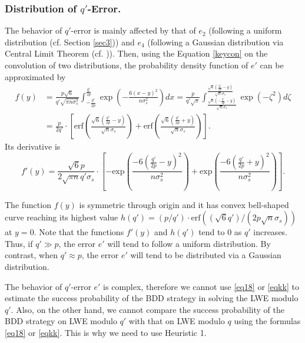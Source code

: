 \documentclass[runningheads]{llncs}
\begin{document}
\subsubsection{Distribution of $q'$-Error.} 
The behavior of $q'$-error is mainly affected by that of $e_2$ (following a uniform distribution (cf. Section \ref{sec3})) and $e_4$ (following a Gaussian distribution via Central Limit Theorem (cf. \cite[Lemma 2]{APS15})). Then, using the Equation  \eqref{keycon} on the convolution of two distributions, the probability density function of $e'$ can be approximated by
\begin{equation}\label{keypdf}
\begin{split}
f(y)&=\frac{p\sqrt{6}}{q'\sqrt{\pi n \sigma_s ^2}} \int_{-\frac{q'}{2p}}^{\frac{q'}{2p}}\exp\left(-\frac{6(x-y)^2}{n\sigma_s^2}\right)dx=\frac{p}{q'\sqrt{\pi}}\int_ {\frac{\sqrt{6} \left(-\frac{q'}{2p}-y \right)}{{\sqrt{n}\sigma_s}}}^ {\frac{\sqrt{6} \left(\frac{q'}{2p}-y \right)}{{\sqrt{n}\sigma_s}}} \exp(-\zeta^2)d\zeta\\
&=\frac{p}{2q'} \cdot \left[\mathrm{erf} \left( \frac{\sqrt{6} \left(\frac{q'}{2p}-y \right)}{\sqrt{n}\sigma_s} \right) +\mathrm{erf} \left( {\frac{\sqrt{6} \left(\frac{q'}{2p}+y \right)}{{\sqrt{n}\sigma_s}}} \right)\right].
\end{split}
\end{equation}
Its derivative is $$f'(y)=\frac{\sqrt{6}p}{2\sqrt{\pi n} q'\sigma_s} \cdot \left[-\text{exp} \left( \frac{-6 \left(\frac{q'}{2p}-y \right)^2}{n\sigma^2_s} \right) +\text{exp} \left( \frac{-6 \left(\frac{q'}{2p}+y \right)^2}{n\sigma^2_s} \right) \right].$$



The function $f(y)$ is symmetric through origin and it has convex bell-shaped curve reaching its highest value $h(q')=({p}/{q'}) \cdot \mathrm{erf} \left( (\sqrt{6}q')/(2p\sqrt{n}\sigma_s)\right)$ 
at $y=0$.
Note that the functions $f'(y)$ and $h(q')$ tend to 0 as $q'$ increases. Thus, if $q' \gg p$, the error $e'$ will tend to follow a uniform distribution. By contrast, when $q' \approx p$, the error $e'$ will tend to be distributed via a Gaussian distribution. 

The behavior of $q'$-error $e'$ is complex, therefore we cannot use \eqref{eq18} or \eqref{eqkk} to estimate the success probability of the BDD strategy in solving the LWE modulo $q'$. Also, on the other hand, we cannot compare the success probability of the BDD strategy on LWE modulo $q'$ with that on LWE modulo $q$ using the formulas \eqref{eq18} or \eqref{eqkk}. This is why we need to use Heuristic 1.
\end{document}

